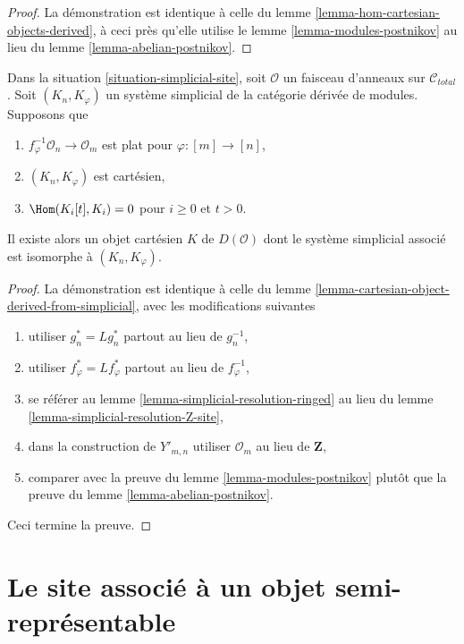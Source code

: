 \begin{proof}
La démonstration est identique à celle du
lemme \ref{lemma-hom-cartesian-objects-derived}, à ceci près qu'elle utilise le
lemme \ref{lemma-modules-postnikov} au lieu du
lemme \ref{lemma-abelian-postnikov}.
\end{proof}

\begin{lemma}
\label{lemma-cartesian-module-derived-from-simplicial}
Dans la situation \ref{situation-simplicial-site}, soit $\mathcal{O}$
un faisceau d'anneaux sur $\mathcal{C}_{total}$. Soit
$(K_n, K_\varphi)$ un système simplicial de la catégorie dérivée
de modules. Supposons que
\begin{enumerate}
\item $f_\varphi^{-1}\mathcal{O}_n \to \mathcal{O}_m$ est plat pour
$\varphi : [m] \to [n]$,
\item $(K_n, K_\varphi)$ est cartésien,
\item $\Hom(K_i[t], K_i) = 0$ pour $i \geq 0$ et $t > 0$.
\end{enumerate}
Il existe alors un objet cartésien $K$ de $D(\mathcal{O})$
dont le système simplicial associé est isomorphe à $(K_n, K_\varphi)$.
\end{lemma}

\begin{proof}
La démonstration est identique à celle du
lemme \ref{lemma-cartesian-object-derived-from-simplicial},
avec les modifications suivantes
\begin{enumerate}
\item utiliser $g_n^* = Lg_n^*$ partout au lieu de $g_n^{-1}$,
\item utiliser $f_\varphi^* = Lf_\varphi^*$ partout au lieu de $f_\varphi^{-1}$,
\item se référer au lemme \ref{lemma-simplicial-resolution-ringed}
au lieu du lemme \ref{lemma-simplicial-resolution-Z-site},
\item dans la construction de $Y'_{m, n}$ utiliser
$\mathcal{O}_m$ au lieu de $\mathbf{Z}$,
\item comparer avec la preuve du lemme \ref{lemma-modules-postnikov}
plutôt que la preuve du lemme \ref{lemma-abelian-postnikov}.
\end{enumerate}
Ceci termine la preuve.
\end{proof}







\section{Le site associé à un objet semi-représentable}
\label{section-semi-representable}

